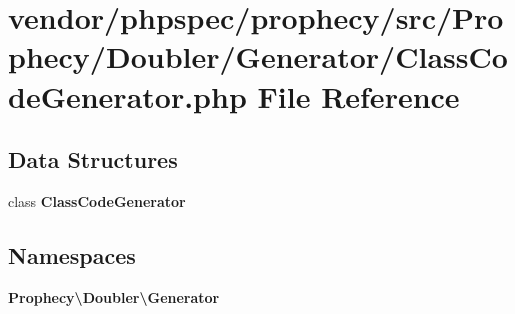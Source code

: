 \section{vendor/phpspec/prophecy/src/\+Prophecy/\+Doubler/\+Generator/\+Class\+Code\+Generator.php File Reference}
\label{_class_code_generator_8php}
\subsection*{Data Structures}
\begin{DoxyCompactItemize}
\item 
class {\bf Class\+Code\+Generator}
\end{DoxyCompactItemize}
\subsection*{Namespaces}
\begin{DoxyCompactItemize}
\item 
 {\bf Prophecy\textbackslash{}\+Doubler\textbackslash{}\+Generator}
\end{DoxyCompactItemize}
